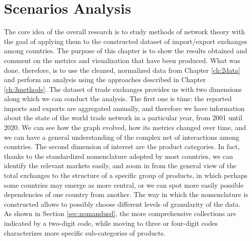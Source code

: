 \chapter{Scenarios Analysis}




The core idea of the overall research is to study methods of network theory with the goal of applying them to the constructed dataset of import/export exchanges among countries. The purpose of this chapter is to show the results obtained and comment on the metrics and visualization that have been produced. What was done, therefore, is to use the cleaned, normalized data from Chapter \ref{ch:2data} and perform an analysis using the approaches described in Chapter \ref{ch:3methods}.
The dataset of trade exchanges provides us with two dimensions along which we can conduct the analysis. The first one is time: the reported imports and exports are aggregated annually, and therefore we have information about the state of the world trade network in a particular year, from 2001 until 2020. We can see how the graph evolved, how its metrics changed over time, and we can have a general understanding of the complex net of interactions among countries.
The second dimension of interest are the product categories. In fact, thanks to the standardized nomenclature adopted by most countries, we can identify the relevant markets easily, and zoom in from the general view of the total exchanges to the structure of a specific group of products, in which perhaps some countries may emerge as more central, or we can spot more easily possible dependencies of one country from another. The way in which the nomenclature is constructed allows to possibly choose different levels of granularity of the data. As shown in Section \ref{sec:nomandusd}, the more comprehensive collections are indicated by a two-digit code, while moving to three or four-digit codes characterizes more specific sub-categories of products.

